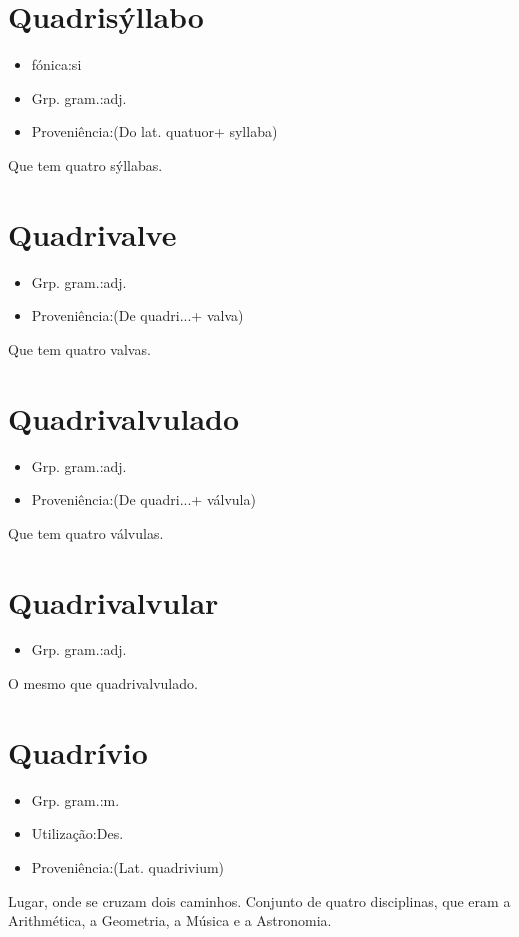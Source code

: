 \section{Quadrisýllabo}
\begin{itemize}
\item {fónica:si}
\end{itemize}
\begin{itemize}
\item {Grp. gram.:adj.}
\end{itemize}
\begin{itemize}
\item {Proveniência:(Do lat. \textunderscore quatuor\textunderscore  + \textunderscore syllaba\textunderscore )}
\end{itemize}
Que tem quatro sýllabas.
\section{Quadrivalve}
\begin{itemize}
\item {Grp. gram.:adj.}
\end{itemize}
\begin{itemize}
\item {Proveniência:(De \textunderscore quadri...\textunderscore  + \textunderscore valva\textunderscore )}
\end{itemize}
Que tem quatro valvas.
\section{Quadrivalvulado}
\begin{itemize}
\item {Grp. gram.:adj.}
\end{itemize}
\begin{itemize}
\item {Proveniência:(De \textunderscore quadri...\textunderscore  + \textunderscore válvula\textunderscore )}
\end{itemize}
Que tem quatro válvulas.
\section{Quadrivalvular}
\begin{itemize}
\item {Grp. gram.:adj.}
\end{itemize}
O mesmo que \textunderscore quadrivalvulado\textunderscore .
\section{Quadrívio}
\begin{itemize}
\item {Grp. gram.:m.}
\end{itemize}
\begin{itemize}
\item {Utilização:Des.}
\end{itemize}
\begin{itemize}
\item {Proveniência:(Lat. \textunderscore quadrivium\textunderscore )}
\end{itemize}
Lugar, onde se cruzam dois caminhos.
Conjunto de quatro disciplinas, que eram a Arithmética, a Geometria, a Música e a Astronomia.
